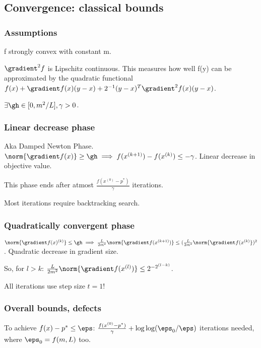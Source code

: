 \documentclass[oneside, article]{memoir}
\begin{document}
\subsection{Convergence: classical bounds}
\subsubsection{Assumptions}
f strongly convex with constant m.

$\gradient^{2} f$ is Lipschitz continuous. This measures how well f(y) can be approximated by the quadratic functional $f(x) + \gradient f(x) (y-x) + 2^{-1}(y-x)^{T} \gradient^{2}f(x) (y-x)$.

$\exists \gh \in [0, m^{2}/L], \gamma > 0$.

\subsubsection{Linear decrease phase}
Aka Damped Newton Phase. $\norm{\gradient f(x)} \geq \gh \implies f(x^{(k+1)}) - f(x^{(k)}) \leq -\gamma$. Linear decrease in objective value.

This phase ends after atmost $\frac{f(x^{(0)} - p^{*})}{\gamma}$ iterations.

Most iterations require backtracking search.

\subsubsection{Quadratically convergent phase}
$\norm{\gradient f(x)^{(k)}} \leq \gh \implies \frac{L}{2m^{2}}\norm{\gradient f(x^{(k+1)})} \leq (\frac{L}{2m^{2}}\norm{\gradient f(x^{(k)}})^{2}$. Quadratic decrease in gradient size.

So, for $l>k$: $\frac{L}{2m^{2}}\norm{\gradient f(x^{(l)})} \leq 2^{-2^{(l-k)}}$.

All iterations use step size $t=1$! \why 


\subsubsection{Overall bounds, defects}
To achieve $f(x) - p^{*} \leq \eps$: $\frac{f(x^{(0)} - p^{*})}{\gamma} + \log \log (\eps_0/ \eps)$ iterations needed, where $\eps_0 = f(m, L)$ too.
\end{document}
